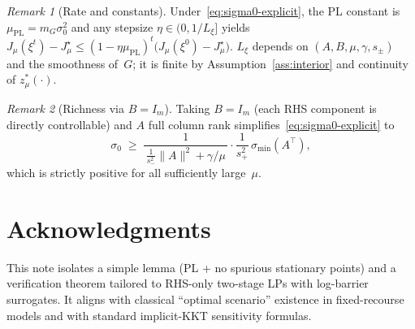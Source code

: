 \documentclass[11pt]{article}
\theoremstyle{remark}
\newtheorem{remark}{Remark}
\begin{document}
\begin{remark}[Rate and constants]
Under~\eqref{eq:sigma0-explicit}, the PL constant is
\(
\mu_{\mathrm{PL}} = m_G \sigma_0^2
\)
and any stepsize $\eta\in(0,1/L_\xi]$ yields
\(
J_\mu(\xi^{t})-J_\mu^\star \le (1-\eta \mu_{\mathrm{PL}})^t\big(J_\mu(\xi^{0})-J_\mu^\star\big).
\)
$L_\xi$ depends on $(A,B,\mu,\gamma,s_\pm)$ and the smoothness of~$G$; it is finite by Assumption~\ref{ass:interior} and continuity of $z^*_\mu(\cdot)$.
\end{remark}

\begin{remark}[Richness via $B=I_m$]
Taking $B=I_m$ (each RHS component is directly controllable) and $A$ full column rank simplifies~\eqref{eq:sigma0-explicit} to
\[
\sigma_0 \;\ge\; \frac{1}{\,\tfrac{1}{s_-^2}\|A\|^2+\gamma/\mu\,}\cdot \frac{1}{s_+^2}\,\sigma_{\min}(A^\top),
\]
which is strictly positive for all sufficiently large~$\mu$.
\end{remark}

\section*{Acknowledgments}
This note isolates a simple lemma (PL + no spurious stationary points) and a verification theorem tailored to RHS-only two-stage LPs with log-barrier surrogates. It aligns with classical ``optimal scenario'' existence in fixed-recourse models and with standard implicit-KKT sensitivity formulas.
\end{document}
